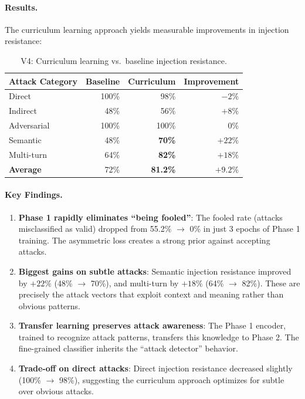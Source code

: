 \documentclass[11pt]{article}
\begin{document}
\paragraph{Results.}
The curriculum learning approach yields measurable improvements in injection resistance:

\begin{table}[h]
\centering
\caption{V4: Curriculum learning vs.\ baseline injection resistance.}
\label{tab:v4_curriculum}
\begin{tabular}{lrrr}
\toprule
Attack Category & Baseline & Curriculum & Improvement \\
\midrule
Direct & 100\% & 98\% & $-2\%$ \\
Indirect & 48\% & 56\% & $+8\%$ \\
Adversarial & 100\% & 100\% & $0\%$ \\
Semantic & 48\% & \textbf{70\%} & \textbf{$+22\%$} \\
Multi-turn & 64\% & \textbf{82\%} & \textbf{$+18\%$} \\
\midrule
\textbf{Average} & 72\% & \textbf{81.2\%} & \textbf{$+9.2\%$} \\
\bottomrule
\end{tabular}
\end{table}

\paragraph{Key Findings.}
\begin{enumerate}[leftmargin=*]
  \item \textbf{Phase 1 rapidly eliminates ``being fooled''}: The fooled rate (attacks misclassified as valid) dropped from 55.2\% $\rightarrow$ 0\% in just 3 epochs of Phase 1 training. The asymmetric loss creates a strong prior against accepting attacks.
  \item \textbf{Biggest gains on subtle attacks}: Semantic injection resistance improved by $+22\%$ (48\% $\rightarrow$ 70\%), and multi-turn by $+18\%$ (64\% $\rightarrow$ 82\%). These are precisely the attack vectors that exploit context and meaning rather than obvious patterns.
  \item \textbf{Transfer learning preserves attack awareness}: The Phase 1 encoder, trained to recognize attack patterns, transfers this knowledge to Phase 2. The fine-grained classifier inherits the ``attack detector'' behavior.
  \item \textbf{Trade-off on direct attacks}: Direct injection resistance decreased slightly (100\% $\rightarrow$ 98\%), suggesting the curriculum approach optimizes for subtle over obvious attacks.
\end{enumerate}
\end{document}
